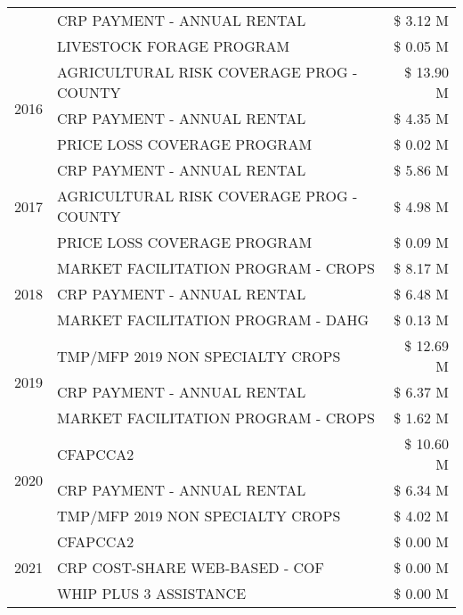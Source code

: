 \begin{tabular}{llr}
 & CRP PAYMENT - ANNUAL RENTAL & \$ 3.12 M \\
 & LIVESTOCK FORAGE PROGRAM & \$ 0.05 M \\
\cline{1-3}
\multirow[t]{3}{*}{2016} & AGRICULTURAL RISK COVERAGE PROG - COUNTY & \$ 13.90 M \\
 & CRP PAYMENT - ANNUAL RENTAL & \$ 4.35 M \\
 & PRICE LOSS COVERAGE PROGRAM & \$ 0.02 M \\
\cline{1-3}
\multirow[t]{3}{*}{2017} & CRP PAYMENT - ANNUAL RENTAL & \$ 5.86 M \\
 & AGRICULTURAL RISK COVERAGE PROG - COUNTY & \$ 4.98 M \\
 & PRICE LOSS COVERAGE PROGRAM & \$ 0.09 M \\
\cline{1-3}
\multirow[t]{3}{*}{2018} & MARKET FACILITATION PROGRAM - CROPS & \$ 8.17 M \\
 & CRP PAYMENT - ANNUAL RENTAL & \$ 6.48 M \\
 & MARKET FACILITATION PROGRAM - DAHG & \$ 0.13 M \\
\cline{1-3}
\multirow[t]{3}{*}{2019} & TMP/MFP 2019 NON SPECIALTY CROPS & \$ 12.69 M \\
 & CRP PAYMENT - ANNUAL RENTAL & \$ 6.37 M \\
 & MARKET FACILITATION PROGRAM - CROPS & \$ 1.62 M \\
\cline{1-3}
\multirow[t]{3}{*}{2020} & CFAPCCA2 & \$ 10.60 M \\
 & CRP PAYMENT - ANNUAL RENTAL & \$ 6.34 M \\
 & TMP/MFP 2019 NON SPECIALTY CROPS & \$ 4.02 M \\
\cline{1-3}
\multirow[t]{3}{*}{2021} & CFAPCCA2 & \$ 0.00 M \\
 & CRP COST-SHARE WEB-BASED - COF & \$ 0.00 M \\
 & WHIP PLUS 3 ASSISTANCE & \$ 0.00 M \\
\cline{1-3}
\bottomrule
\end{tabular}
